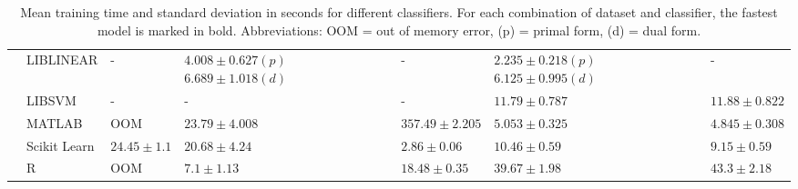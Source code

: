 \documentclass[utf8]{frontiersSCNS} %
\begin{document}
\begin{table}
\begin{tabular}{ |p{1.1cm}|p{1.4cm}|p{2cm}|p{2.1cm}|p{2cm}|p{2.1cm}|p{2cm}|}
  & LIBLINEAR & - & $\mathbf{4.008}\pm0.627(p)$ $6.689\pm1.018(d)$ & - & $2.235\pm0.218(p)$ $6.125\pm0.995(d)$ & - \\
\cline{2-7}
  & LIBSVM & - & - & - & $11.79\pm0.787$ & $11.88\pm0.822$ \\
\cline{2-7}
  & MATLAB & OOM & $23.79\pm4.008$ & $357.49\pm2.205$ & $5.053\pm0.325$ & $4.845\pm0.308$\\
\cline{2-7}
   & Scikit Learn & $24.45\pm1.1$ & $20.68\pm4.24$ & $2.86\pm0.06$ & $10.46\pm0.59$ & $9.15\pm0.59$\\
\cline{2-7}
  & R & OOM & $7.1\pm1.13$ & $18.48\pm0.35$ & $39.67\pm1.98$ & $43.3\pm2.18$ \\\hline
\end{tabular}
\caption{Mean training time and standard deviation in seconds for different classifiers. For each combination of dataset and classifier, the fastest model is marked in bold. Abbreviations: OOM = out of memory error, (p) = primal form, (d) = dual form.}
\label{tab:classification}
\end{table}
\end{document}
